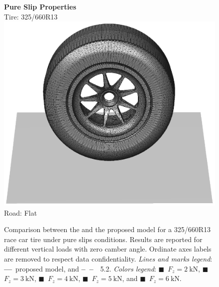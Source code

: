 \begin{figure}
  \centering
  \begin{minipage}[c]{0.70\linewidth}
    \raggedleft
  \end{minipage}%
  \hfill
  \begin{minipage}[c]{0.29\linewidth}
    \centering
    \textbf{Pure Slip Properties} \\[0.4em]
    Tire: 325/660R13 \\[0.4em]
    \includegraphics[width=1.0\linewidth, trim={17.25cm 4.25cm 15.25cm 7.0cm}, clip]{./figures/chapter_4/render_flat}
    Road: Flat
  \end{minipage}
  \caption{Comparison between the \MagicFormulae{} and the proposed model for a 325/660R13 race car tire under pure slips conditions. Results are reported for different vertical loads with zero camber angle. Ordinate axes labels are removed to respect data confidentiality. \emph{Lines and marks legend}: \textbf{---}~proposed model, and \textbf{--~--}~\MagicFormulae{}~5.2. \emph{Colors legend}: \textcolor{mycolor1}{$\blacksquare$}~$F_z = \SI{2}{\kilo\newton}$, \textcolor{mycolor2}{$\blacksquare$}~$F_z = \SI{3}{\kilo\newton}$, \textcolor{mycolor3}{$\blacksquare$}~$F_z = \SI{4}{\kilo\newton}$, \textcolor{mycolor4}{$\blacksquare$}~$F_z = \SI{5}{\kilo\newton}$, and \textcolor{mycolor5}{$\blacksquare$}~$F_z = \SI{6}{\kilo\newton}$.}
  \label{chap4:fig:racecar_pure}
\end{figure}

